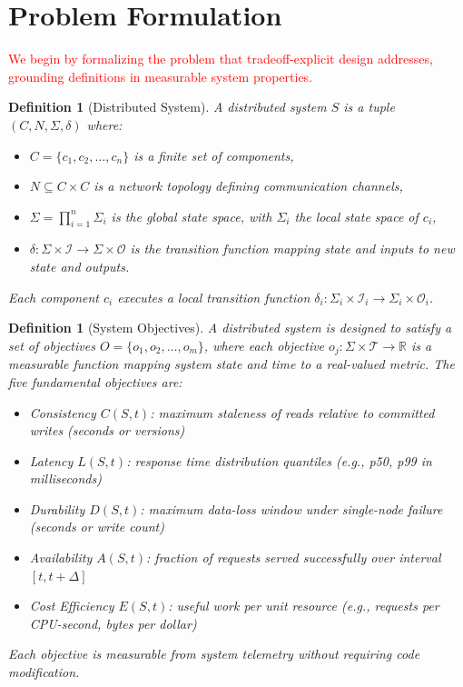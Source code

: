 \documentclass[conference]{IEEEtran}
\newtheorem{definition}[theorem]{Definition}
\begin{document}
\section{Problem Formulation}
\label{sec:problem}

\textcolor{red}{We begin by formalizing the problem that tradeoff-explicit design addresses, grounding definitions in measurable system properties.}

{\color{red}
\begin{definition}[Distributed System]
A distributed system $S$ is a tuple $(C, N, \Sigma, \delta)$ where:
\begin{itemize}
    \item $C = \{c_1, c_2, \ldots, c_n\}$ is a finite set of components,
    \item $N \subseteq C \times C$ is a network topology defining communication channels,
    \item $\Sigma = \prod_{i=1}^n \Sigma_i$ is the global state space, with $\Sigma_i$ the local state space of $c_i$,
    \item $\delta: \Sigma \times \mathcal{I} \to \Sigma \times \mathcal{O}$ is the transition function mapping state and inputs to new state and outputs.
\end{itemize}
Each component $c_i$ executes a local transition function $\delta_i: \Sigma_i \times \mathcal{I}_i \to \Sigma_i \times \mathcal{O}_i$.
\end{definition}}

{\color{red}
\begin{definition}[System Objectives]
A distributed system is designed to satisfy a set of objectives $O = \{o_1, o_2, \ldots, o_m\}$, where each objective $o_j: \Sigma \times \mathcal{T} \to \mathbb{R}$ is a measurable function mapping system state and time to a real-valued metric. The five fundamental objectives are:
\begin{itemize}
    \item \textit{Consistency} $C(S,t)$: maximum staleness of reads relative to committed writes (seconds or versions)
    \item \textit{Latency} $L(S,t)$: response time distribution quantiles (e.g., p50, p99 in milliseconds)
    \item \textit{Durability} $D(S,t)$: maximum data-loss window under single-node failure (seconds or write count)
    \item \textit{Availability} $A(S,t)$: fraction of requests served successfully over interval $[t, t+\Delta]$
    \item \textit{Cost Efficiency} $E(S,t)$: useful work per unit resource (e.g., requests per CPU-second, bytes per dollar)
\end{itemize}
Each objective is measurable from system telemetry without requiring code modification.
\end{definition}}
\end{document}
